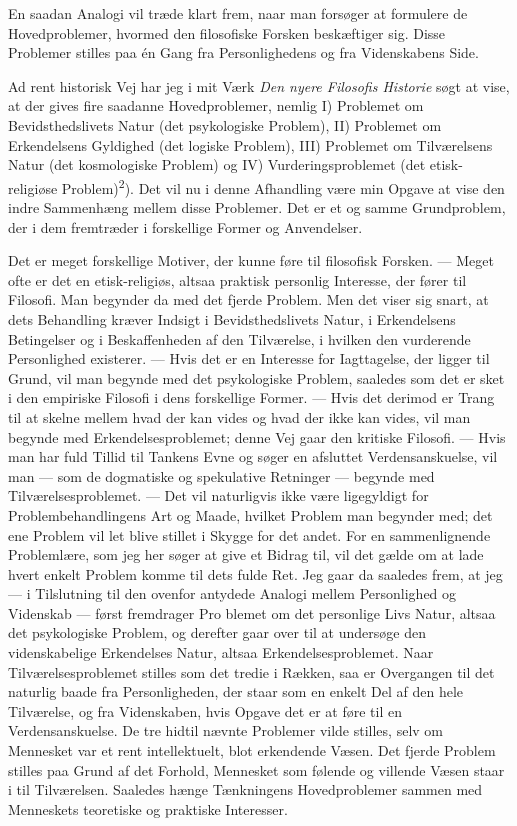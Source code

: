 \documentclass[12pt,a4paper,openany]{book}
\newcommand{\opage}[1]{\marginnote{\footnotesize\textit{[#1]}}}
\begin{document}
\opage{3}En saadan Analogi vil træde klart frem, naar man forsøger at formulere
de Hovedproblemer, hvormed den filosofiske Forsken beskæftiger sig. Disse
Problemer stilles paa én Gang fra Personlighedens og fra Videnskabens Side.

Ad rent historisk Vej har jeg i mit Værk \textit{Den nyere Filosofis Historie}
søgt at vise, at der gives fire saadanne Hovedproblemer, nemlig I) Problemet om
Bevidsthedslivets Natur (det psykologiske Problem), II) Problemet om
Erkendelsens Gyldighed (det logiske Problem), III) Problemet om Tilværelsens
Natur (det kosmologiske Problem) og IV) Vurderingsproblemet (det
etisk-religiøse Problem)\textsuperscript{2}). Det vil nu i denne Afhandling
være min Opgave at vise den indre Sammenhæng mellem disse Problemer. Det er et
og samme Grundproblem, der i dem fremtræder i forskellige Former og Anvendelser.

Det er meget forskellige Motiver, der kunne føre til filosofisk Forsken. ---
Meget ofte er det en etisk-religiøs, altsaa praktisk personlig Interesse, der
fører til Filosofi. Man begynder da med det fjerde Problem. Men det viser sig
snart, at dets Behandling kræver Indsigt i Bevidsthedslivets Natur, i
Erkendelsens Betingelser og i Beskaffenheden af den Tilværelse, i hvilken den
vurderende Personlighed existerer. --- Hvis det er en Interesse for
Iagttagelse, der ligger til Grund, vil man begynde med det psykologiske
Problem, saaledes som det er sket i den empiriske Filosofi i dens forskellige
Former. --- Hvis det derimod er Trang til at skelne mellem hvad der kan vides
og hvad der ikke kan vides, vil man begynde med Erkendelsesproblemet; denne Vej
gaar den kritiske Filosofi. --- Hvis man har fuld Tillid til Tankens Evne og
søger en afsluttet Verdensanskuelse, vil man --- som de dogmatiske og
spekulative Retninger --- begynde med Tilværelsesproblemet. --- Det vil
naturligvis ikke være ligegyldigt for Problembehandlingens Art og Maade,
hvilket Problem man begynder med; det ene Problem vil let blive stillet i
Skygge for det andet. For en sammenlignende Problemlære, som jeg her søger at
give et Bidrag til, vil det gælde om at lade hvert enkelt Problem komme til
dets fulde Ret. Jeg gaar da saaledes frem, at jeg --- i Tilslutning til den
ovenfor antydede Analogi mellem Personlighed og Videnskab --- først fremdrager Pro%
\opage{4}blemet om det personlige Livs Natur, altsaa det psykologiske Problem,
og derefter gaar over til at undersøge den videnskabelige Erkendelses Natur,
altsaa Erkendelsesproblemet. Naar Tilværelsesproblemet stilles som det tredie i
Rækken, saa er Overgangen til det naturlig baade fra Personligheden, der staar
som en enkelt Del af den hele Tilværelse, og fra Videnskaben, hvis Opgave det
er at føre til en Verdensanskuelse. De tre hidtil nævnte Problemer vilde
stilles, selv om Mennesket var et rent intellektuelt, blot erkendende Væsen.
Det fjerde Problem stilles paa Grund af det Forhold, Mennesket som følende og
villende Væsen staar i til Tilværelsen. Saaledes hænge Tænkningens
Hovedproblemer sammen med Menneskets teoretiske og praktiske Interesser.
\end{document}
